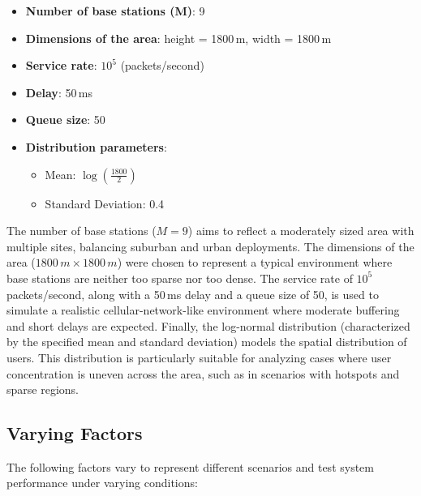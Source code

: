 \documentclass{report}
\begin{document}
\begin{itemize}
    \item \textbf{Number of base stations (M)}: 9
    \item \textbf{Dimensions of the area}: height = 1800\,m, width = 1800\,m
    \item \textbf{Service rate}: $10^5$ (packets/second)
    \item \textbf{Delay}: 50\,ms
    \item \textbf{Queue size}: 50
    \item \textbf{Distribution parameters}:
    \begin{itemize}
        \item Mean: $\log \left(\frac{1800}{2}\right)$
        \item Standard Deviation: 0.4
    \end{itemize}
\end{itemize}
The number of base stations ($M = 9$) aims to reflect a moderately sized area with multiple sites, balancing suburban and urban deployments.
The dimensions of the area ($1800\,m \times 1800\,m$) were chosen to represent a typical environment where base stations are neither too sparse nor too dense.
The service rate of $10^5$ packets/second, along with a 50\,ms delay and a queue size of 50, is used to simulate a realistic cellular-network-like environment where moderate buffering and short delays are expected.
Finally, the log-normal distribution (characterized by the specified mean and standard deviation) models the spatial distribution of users.
This distribution is particularly suitable for analyzing cases where user concentration is uneven across the area, such as in scenarios with hotspots and sparse regions.

\subsection{Varying Factors}
The following factors vary to represent different scenarios and test system performance under varying conditions:
\end{document}
